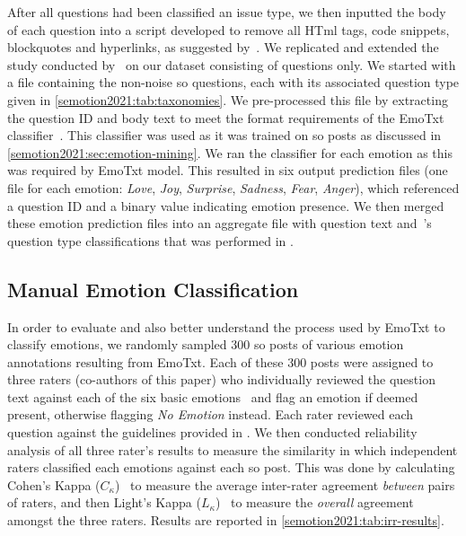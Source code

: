 After all questions had been classified an issue type, we then inputted the body of each question into a script developed to remove all HT\gls{ml} tags, code snippets, blockquotes and hyperlinks, as suggested by~\citet{novielli2018}. We replicated and extended the study conducted by~\citet{novielli2018} on our dataset consisting of questions only.
We started with a file containing the \SEMNumTotalNonNoisePosts{} non-noise \gls{so} questions, each with its associated question type given in \cref{semotion2021:tab:taxonomies}. We pre-processed this file by extracting the question ID and body text to meet the format requirements of the EmoTxt classifier~\citep{calefato2017}. This classifier was used as it was trained on \gls{so} posts as discussed in \cref{semotion2021:sec:emotion-mining}. We ran the classifier for each emotion as this was required by EmoTxt model. This resulted in six output prediction files (one file for each emotion: \textit{Love}, \textit{Joy}, \textit{Surprise}, \textit{Sadness}, \textit{Fear}, \textit{Anger}), which referenced a question ID and a binary value indicating emotion presence. We then merged these emotion prediction files into an aggregate file with question text and~\citeauthor{Beyer:2018fm}'s question type classifications that was performed in \citep{Cummaudo:2020icse}.

\subsection{Manual Emotion Classification} 
\label{semotion2021:ssec:manual}
\def\cohen{$C_{\kappa}$}
\def\light{$L_{\kappa}$}

In order to evaluate and also better understand the process used by EmoTxt to classify emotions, we randomly sampled 300 \gls{so} posts of various emotion annotations resulting from EmoTxt. Each of these 300 posts were assigned to three raters (co-authors of this paper) who individually reviewed the question text against each of the six basic emotions~\citep{shaver1987} and flag an emotion if deemed present, otherwise flagging \textit{No Emotion} instead. Each rater reviewed each question against the guidelines provided in \citep{novielli2018}. We then conducted reliability analysis of all three rater's results to measure the similarity in which independent raters classified each emotions against each \gls{so} post. This was done by calculating Cohen's Kappa (\cohen{})~\citep{Cohen:1960tf} to measure the average inter-rater agreement \textit{between} pairs of raters, and then Light's Kappa (\light{})~\citep{Light:1971vz} to measure the \textit{overall} agreement amongst the three raters. Results are reported in \cref{semotion2021:tab:irr-results}.

